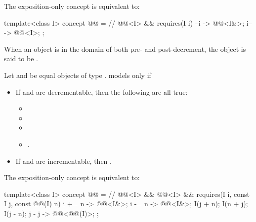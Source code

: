 \pnum
The exposition-only  concept is equivalent to:
\begin{itemdecl}
template<class I>
  concept @@ =               // \expos
    @@<I> && requires(I i) {
      { --i } -> @@<I&>;
      { i-- } -> @@<I>;
    };
\end{itemdecl}

\begin{itemdescr}
\pnum
When an object is in the domain of both pre- and post-decrement,
the object is said to be .

\pnum
Let  and  be equal objects of type .
 models  only if
\begin{itemize}
\item If  and  are decrementable,
  then the following are all true:
  \begin{itemize}
  \item {}
  \item {}
  \item {}
  \item {}.
  \end{itemize}
\item If  and  are incrementable,
  then .
\end{itemize}
\end{itemdescr}

\pnum
The exposition-only  concept is equivalent to:
\begin{itemdecl}
template<class I>
  concept @@ =                 // \expos
    @@<I> && @@<I> &&
    requires(I i, const I j, const @@(I) n) {
      { i += n } -> @@<I&>;
      { i -= n } -> @@<I&>;
      I(j + n);
      I(n + j);
      I(j - n);
      { j - j } -> @@<@@(I)>;
    };
\end{itemdecl}

